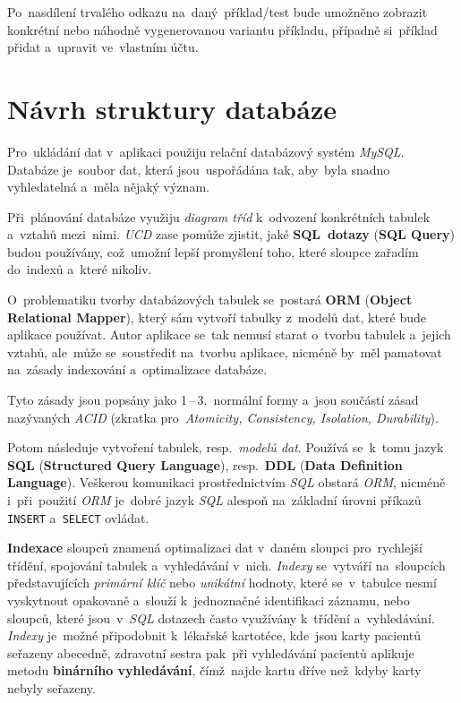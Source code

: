 \documentclass[11pt,a4paper]{report}
\begin{document}
            Po~nasdílení trvalého odkazu na~daný~příklad/test bude umožněno zobrazit konkrétní nebo náhodně vygenerovanou variantu příkladu, případně si~příklad přidat a~upravit ve~vlastním účtu.

        \section{Návrh struktury databáze}
            Pro~ukládání dat v~aplikaci použiju relační databázový systém \emph{MySQL}. Databáze je~soubor dat, která jsou~uspořádána tak, aby~byla snadno vyhledatelná a~měla nějaký význam.

            Při~plánování databáze využiju \emph{diagram tříd} k~odvození konkrétních tabulek a~vztahů mezi~nimi. \emph{UCD} zase pomůže zjistit, jaké \textbf{SQL~dotazy} (\textbf{SQL Query}) budou používány, což~umožní lepší promyšlení toho, které sloupce zařadím do~indexů a~které nikoliv.

            O~problematiku tvorby databázových tabulek se~postará \textbf{ORM} (\textbf{Object Relational Mapper}), který sám vytvoří tabulky z~modelů dat, které bude aplikace používat. Autor aplikace se~tak nemusí starat o~tvorbu tabulek a~jejich vztahů, ale~může se~soustředit na~tvorbu aplikace, nicméně by~měl pamatovat na~zásady indexování a~optimalizace databáze.
            
            Tyto zásady jsou popsány jako 1\,--\,3.~normální formy a~jsou součástí zásad nazývaných \emph{ACID} (zkratka pro~\emph{Atomicity, Consistency, Isolation, Durability}). \cite{interval:normalniformydb, bmcACIDExplained}

            Potom následuje vytvoření tabulek, resp.~\emph{modelů dat}. Používá se~k~tomu jazyk \textbf{SQL} (\textbf{Structured Query Language}), resp.~\textbf{DDL} (\textbf{Data Definition Language}). Veškerou komunikaci prostřednictvím \emph{SQL} obstará \emph{ORM}, nicméně i~při~použití \emph{ORM} je~dobré jazyk \emph{SQL} alespoň na~základní úrovni příkazů \texttt{INSERT} a~\texttt{SELECT} ovládat.

            \textbf{Indexace} sloupců znamená optimalizaci dat v~daném sloupci pro~rychlejší třídění, spojování tabulek a~vyhledávání v~nich. \emph{Indexy} se~vytváří na~sloupcích představujících \emph{primární klíč} nebo \emph{unikátní} hodnoty, které se~v~tabulce nesmí vyskytnout opakovaně a~slouží k~jednoznačné identifikaci záznamu, nebo sloupců, které jsou~v~\emph{SQL} dotazech často využívány k~třídění a~vyhledávání. \emph{Indexy} je~možné připodobnit k~lékařské kartotéce, kde~jsou karty pacientů seřazeny abecedně, zdravotní sestra pak~při vyhledávání pacientů aplikuje metodu \textbf{binárního vyhledávání}, čímž~najde kartu dříve než~kdyby karty nebyly seřazeny. \cite{interval:normalniformydb, laurencik2018sql}
\end{document}
